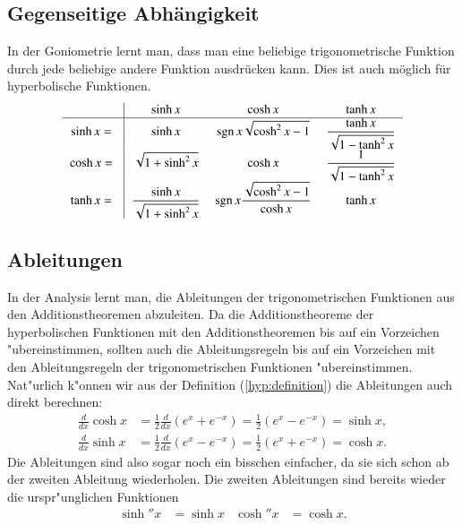 \subsection{Gegenseitige Abhängigkeit%
\label{skript:sinh:section:abh}}
In der Goniometrie lernt man, dass man eine beliebige trigonometrische
Funktion durch jede beliebige andere Funktion ausdrücken kann.
Dies ist auch möglich für hyperbolische Funktionen.
\[
\begin{tabular}{>{$\displaystyle}c<{$}|>{$\displaystyle}c<{$}>{$\displaystyle}c<{$}>{$\displaystyle}c<{$}}
&\sinh x&\cosh x & \tanh x
\\
\hline
\sinh x=\mathstrut
&\sinh x
	&\operatorname{sgn}x\sqrt{\cosh^2x-1}
		&\frac{\tanh x}{\sqrt{1-\tanh^2 x}}
\\
\cosh x=\mathstrut
&\sqrt{1+\sinh^2 x}
	&\cosh x
		&\frac1{\sqrt{1-\tanh^2 x}}
\\
\tanh x=\mathstrut
&\frac{\sinh x}{\sqrt{1+\sinh^2 x}}
	&\operatorname{sgn}x\frac{\sqrt{\cosh^2 x - 1}}{\cosh x}
		&\tanh x
\end{tabular}
\]

\subsection{Ableitungen}
In der Analysis lernt man, die Ableitungen der trigonometrischen Funktionen
aus den Additionstheoremen abzuleiten.
Da die Additionstheoreme der hyperbolischen Funktionen mit den 
Additionstheoremen bis auf ein Vorzeichen "ubereinstimmen, sollten
auch die Ableitungsregeln bis auf ein Vorzeichen mit den Ableitungsregeln
der trigonometrischen Funktionen "ubereinstimmen. 
Nat"urlich k"onnen wir aus der Definition (\ref{hyp:definition}) die
Ableitungen auch direkt berechnen:
\begin{align*}
\frac{d}{dx}\cosh x
&=
\frac12\frac{d}{dx}(e^x+e^{-x})
=
\frac12(e^x-e^{-x})=\sinh x,
\\
\frac{d}{dx}\sinh x
&=
\frac12\frac{d}{dx}(e^x-e^{-x})
=
\frac12(e^x+e^{-x})=\cosh x.
\end{align*}
Die Ableitungen sind also sogar noch ein bisschen einfacher, da sie sich
schon ab der zweiten Ableitung wiederholen.
Die zweiten Ableitungen sind bereits wieder die urspr"unglichen Funktionen
\begin{align*}
\sinh''x&=\sinh x
&
\cosh''x&=\cosh x.
\end{align*}

